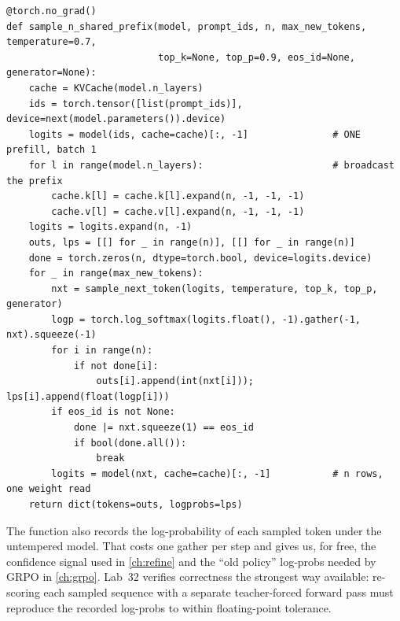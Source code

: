 \begin{lstlisting}[caption={Prefill once, fan out, decode $n$ samples as a batch (\texttt{llmsys/tts.py}).},label={lst:scaling:shared}]
@torch.no_grad()
def sample_n_shared_prefix(model, prompt_ids, n, max_new_tokens, temperature=0.7,
                           top_k=None, top_p=0.9, eos_id=None, generator=None):
    cache = KVCache(model.n_layers)
    ids = torch.tensor([list(prompt_ids)], device=next(model.parameters()).device)
    logits = model(ids, cache=cache)[:, -1]               # ONE prefill, batch 1
    for l in range(model.n_layers):                       # broadcast the prefix
        cache.k[l] = cache.k[l].expand(n, -1, -1, -1)
        cache.v[l] = cache.v[l].expand(n, -1, -1, -1)
    logits = logits.expand(n, -1)
    outs, lps = [[] for _ in range(n)], [[] for _ in range(n)]
    done = torch.zeros(n, dtype=torch.bool, device=logits.device)
    for _ in range(max_new_tokens):
        nxt = sample_next_token(logits, temperature, top_k, top_p, generator)
        logp = torch.log_softmax(logits.float(), -1).gather(-1, nxt).squeeze(-1)
        for i in range(n):
            if not done[i]:
                outs[i].append(int(nxt[i])); lps[i].append(float(logp[i]))
        if eos_id is not None:
            done |= nxt.squeeze(1) == eos_id
            if bool(done.all()):
                break
        logits = model(nxt, cache=cache)[:, -1]           # n rows, one weight read
    return dict(tokens=outs, logprobs=lps)
\end{lstlisting}

The function also records the log-probability of each sampled token under the untempered model.
That costs one gather per step and gives us, for free, the confidence signal used in
\cref{ch:refine} and the ``old policy'' log-probs needed by GRPO in \cref{ch:grpo}. Lab~32 verifies
correctness the strongest way available: re-scoring each sampled sequence with a separate
teacher-forced forward pass must reproduce the recorded log-probs to within floating-point
tolerance.

